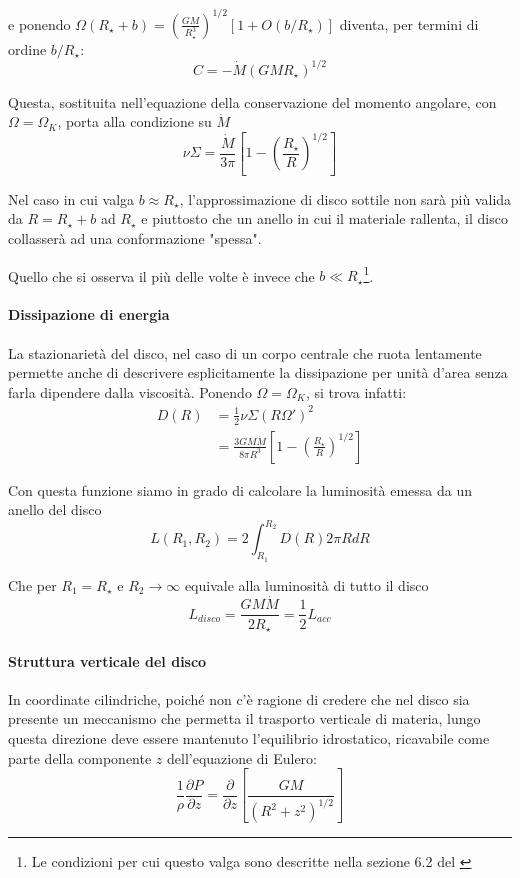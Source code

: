 \documentclass[a4paperbi]{article}
\begin{document}
	e ponendo $\Omega(R_{\star}+b)=\left(\frac{GM}{R_{\star}^3}\right)^{1/2}[1+O(b/R_{\star})]$ diventa, per termini di ordine $b/R_{\star}$:
	\begin{equation}
		C=-\dot{M}(GMR_{\star})^{1/2}
	\end{equation}	

	Questa, sostituita nell'equazione della conservazione del momento angolare, con $\Omega=\Omega_K$, porta alla condizione su $\dot{M}$
	\begin{equation}
		\nu\Sigma=\frac{\dot{M}}{3\pi}\left[1-\left(\frac{R_{\star}}{R}\right)^{1/2}\right]
	\end{equation}
	
	Nel caso in cui valga $b\approx R_{\star}$, l'approssimazione di disco sottile non sarà più valida da $R=R_{\star}+b$ ad $R_{\star}$ e piuttosto che un anello in cui il materiale rallenta, il disco collasserà ad una conformazione "spessa".
	
	Quello che si osserva il più delle volte è invece che $b\ll R_{\star}$\footnote{Le condizioni per cui questo valga sono descritte nella sezione 6.2 del \cite{FrankKingRaineAccretionPower}}.	
	
	\paragraph{Dissipazione di energia}
	La stazionarietà del disco, nel caso di un corpo centrale che ruota lentamente permette anche di descrivere esplicitamente la dissipazione per unità d'area senza farla dipendere dalla viscosità. Ponendo $\Omega=\Omega_K$, si trova infatti:
	\begin{align}
		D(R)&=\frac{1}{2}\nu\Sigma(R\Omega')^2
			\\&=\frac{3GM\dot{M}}{8\pi R^3}\left[1-\left(\frac{R_{\star}}{R}\right)^{1/2}\right]
	\end{align}	
	
	Con questa funzione siamo in grado di calcolare la luminosità emessa da un anello del disco
	\begin{equation}
		L(R_1,R_2)=2\int_{R_1}^{R_2}D(R)2\pi RdR
	\end{equation}
	
	Che per $R_1=R_{\star}$ e $R_2\to\infty$ equivale alla luminosità di tutto il disco
	\begin{equation}
		L_{disco}=\frac{GM\dot{M}}{2R_{\star}}=\frac{1}{2}L_{acc}
	\end{equation}
	
	\paragraph{Struttura verticale del disco}
	In coordinate cilindriche, poiché non c'è ragione di credere che nel disco sia presente un meccanismo che permetta il trasporto verticale di materia, lungo questa direzione deve essere mantenuto l'equilibrio idrostatico, ricavabile come parte della componente $z$ dell'equazione di Eulero:
	\begin{equation*}
		\frac{1}{\rho}\frac{\partial P}{\partial z}=\frac{\partial}{\partial z}\left[\frac{GM}{(R^2+z^2)^{1/2}}\right]
	\end{equation*}
	
\end{document}
